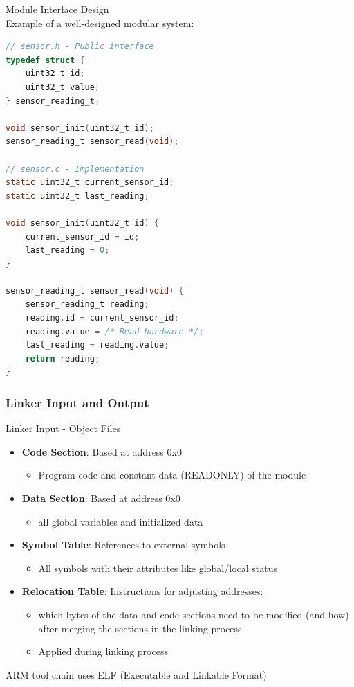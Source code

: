 \begin{example2}{Module Interface Design}\\
Example of a well-designed modular system:

\begin{lstlisting}[language=C, style=basesmol]
// sensor.h - Public interface
typedef struct {
    uint32_t id;
    uint32_t value;
} sensor_reading_t;

void sensor_init(uint32_t id);
sensor_reading_t sensor_read(void);

// sensor.c - Implementation
static uint32_t current_sensor_id;
static uint32_t last_reading;

void sensor_init(uint32_t id) {
    current_sensor_id = id;
    last_reading = 0;
}

sensor_reading_t sensor_read(void) {
    sensor_reading_t reading;
    reading.id = current_sensor_id;
    reading.value = /* Read hardware */;
    last_reading = reading.value;
    return reading;
}
\end{lstlisting}
\end{example2}

\columnbreak




\subsubsection{Linker Input and Output}


\begin{definition}{Linker Input - Object Files}
\begin{itemize}
  \item \textbf{Code Section}: Based at address 0x0
    \begin{itemize}
      \item Program code and constant data (READONLY) of the module
    \end{itemize}
  \item \textbf{Data Section}: Based at address 0x0
    \begin{itemize}
      \item all global variables and initialized data
    \end{itemize}
  \item \textbf{Symbol Table}: References to external symbols
    \begin{itemize}
      \item All symbols with their attributes like global/local status
    \end{itemize}
  \item \textbf{Relocation Table}: Instructions for adjusting addresses:
    \begin{itemize}
      \item which bytes of the data and code sections need to be modified (and how) after merging the sections in the linking process
      \item Applied during linking process
    \end{itemize}
\end{itemize}
ARM tool chain uses ELF (Executable and Linkable Format)
\end{definition}

